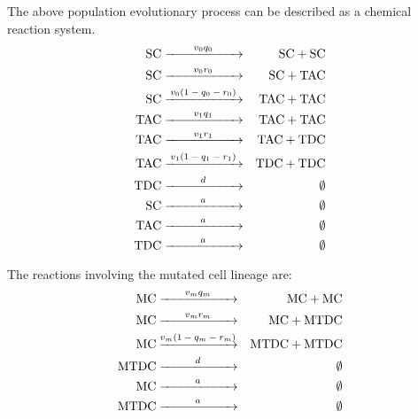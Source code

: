 \documentclass[12pt]{article}
\begin{document}
The above population evolutionary process 
can be described as a chemical reaction system.
\begin{eqnarray*}
\mathrm{SC} &\xrightarrow[]{\makebox[2.0cm]{\scriptsize{$v_0 q_0$}}}& 
\mathrm{SC} + \mathrm{SC} \\
\mathrm{SC} &\xrightarrow[]{\makebox[2.0cm]{\scriptsize{$v_0 r_0$}}}& 
\mathrm{SC} + \mathrm{TAC} \\
\mathrm{SC} &\xrightarrow[]{\makebox[2.0cm]{\scriptsize{$v_0 (1-q_0-r_0)$}}}& 
\mathrm{TAC} + \mathrm{TAC} \\
\mathrm{TAC} &\xrightarrow[]{\makebox[2.0cm]{\scriptsize{$v_1 q_1$}}}& 
\mathrm{TAC} + \mathrm{TAC} \\
\mathrm{TAC} &\xrightarrow[]{\makebox[2.0cm]{\scriptsize{$v_1 r_1$}}}& 
\mathrm{TAC} + \mathrm{TDC} \\
\mathrm{TAC} &\xrightarrow[]{\makebox[2.0cm]{\scriptsize{$v_1 (1-q_1-r_1)$}}}& 
\mathrm{TDC} + \mathrm{TDC} \\
\mathrm{TDC} &\xrightarrow[]{\makebox[2.0cm]{\scriptsize{$d$}}}& \emptyset \\
\mathrm{SC} &\xrightarrow[]{\makebox[2.0cm]{\scriptsize{$a$}}}& \emptyset \\
\mathrm{TAC} &\xrightarrow[]{\makebox[2.0cm]{\scriptsize{$a$}}}& \emptyset \\
\mathrm{TDC} &\xrightarrow[]{\makebox[2.0cm]{\scriptsize{$a$}}}& \emptyset
\end{eqnarray*}


The reactions involving the mutated cell lineage are:
\begin{eqnarray*}
\mathrm{MC} &\xrightarrow[]{\makebox[2.0cm]{\scriptsize{$v_m q_m$}}}& 
\mathrm{MC} + \mathrm{MC} \\
\mathrm{MC} &\xrightarrow[]{\makebox[2.0cm]{\scriptsize{$v_m r_m$}}}& 
\mathrm{MC} + \mathrm{MTDC} \\
\mathrm{MC} &\xrightarrow[]{\makebox[2.0cm]{\scriptsize{$v_m (1-q_m-r_m)$}}}& 
\mathrm{MTDC} + \mathrm{MTDC} \\
\mathrm{MTDC} &\xrightarrow[]{\makebox[2.0cm]{\scriptsize{$d$}}}& \emptyset \\
\mathrm{MC} &\xrightarrow[]{\makebox[2.0cm]{\scriptsize{$a$}}}& \emptyset \\
\mathrm{MTDC} &\xrightarrow[]{\makebox[2.0cm]{\scriptsize{$a$}}}& \emptyset \\
\end{eqnarray*}
\end{document}
